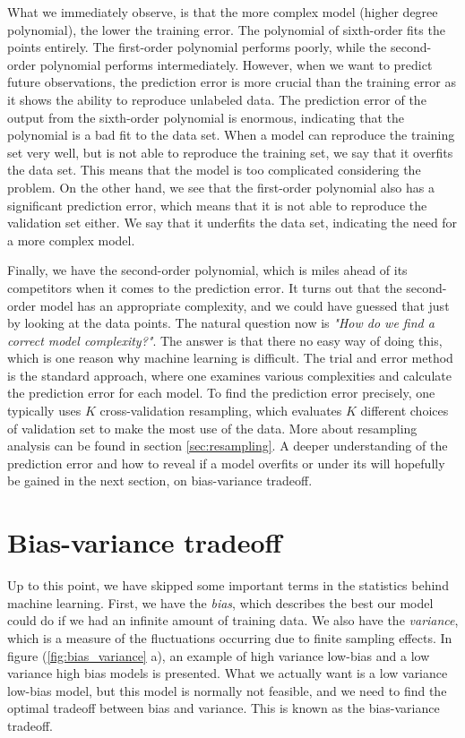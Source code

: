 What we immediately observe, is that the more complex model (higher degree polynomial), the lower the training error. The polynomial of sixth-order fits the points entirely. The first-order polynomial performs poorly, while the second-order polynomial performs intermediately. However, when we want to predict future observations, the prediction error is more crucial than the training error as it shows the ability to reproduce unlabeled data. The prediction error of the output from the sixth-order polynomial is enormous, indicating that the polynomial is a bad fit to the data set. When a model can reproduce the training set very well, but is not able to reproduce the training set, we say that it overfits the data set. This means that the model is too complicated considering the problem. On the other hand, we see that the first-order polynomial also has a significant prediction error, which means that it is not able to reproduce the validation set either. We say that it underfits the data set, indicating the need for a more complex model.

Finally, we have the second-order polynomial, which is miles ahead of its competitors when it comes to the prediction error. It turns out that the second-order model has an appropriate complexity, and we could have guessed that just by looking at the data points. The natural question now is \textit{"How do we find a correct model complexity?"}. The answer is that there no easy way of doing this, which is one reason why machine learning is difficult. The trial and error method is the standard approach, where one examines various complexities and calculate the prediction error for each model. To find the prediction error precisely, one typically uses $K$ cross-validation resampling, which evaluates $K$ different choices of validation set to make the most use of the data. More about resampling analysis can be found in section \ref{sec:resampling}. A deeper understanding of the prediction error and how to reveal if a model overfits or under its will hopefully be gained in the next section, on bias-variance tradeoff. 

\section{Bias-variance tradeoff}
Up to this point, we have skipped some important terms in the statistics behind machine learning. First, we have the \textit{bias}, which describes the best our model could do if we had an infinite amount of training data. We also have the \textit{variance}, which is a measure of the fluctuations occurring due to finite sampling effects. In figure (\ref{fig:bias_variance} a), an example of high variance low-bias and a low variance high bias models is presented. What we actually want is a low variance low-bias model, but this model is normally not feasible, and we need to find the optimal tradeoff between bias and variance. This is known as the bias-variance tradeoff. 

